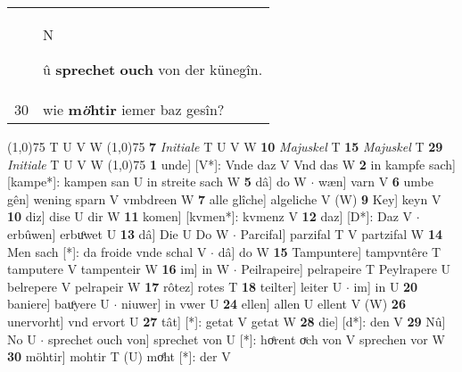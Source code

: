 \documentclass[8pt,a4paper,notitlepage]{article}
\begin{document}
\begin{table}[ht]
\begin{minipage}[t]{0.5\linewidth}
\begin{tabular}{rl}
 & \begin{large}N\end{large}û \textbf{sprechet} \textbf{ouch} von der künegîn.\\ 
30 & wie \textbf{m\textit{ö}htir} iemer baz gesîn?\\ 
\end{tabular}
\scriptsize
\line(1,0){75} \newline
T U V W \newline
\line(1,0){75} \newline
\textbf{7} \textit{Initiale} T U V W  \textbf{10} \textit{Majuskel} T  \textbf{15} \textit{Majuskel} T  \textbf{29} \textit{Initiale} T U V W  \newline
\line(1,0){75} \newline
\textbf{1} unde] [V*]: Vnde daz V Vnd das W \textbf{2} in kampfe sach] [kampe*]: kampen san U in streite sach W \textbf{5} dâ] do W  $\cdot$ wæn] varn V \textbf{6} umbe gên] wening sparn V vmbdreen W \textbf{7} alle glîche] algeliche V (W) \textbf{9} Key] keyn V \textbf{10} diz] dise U dir W \textbf{11} komen] [kvmen*]: kvmenz V \textbf{12} daz] [D*]: Daz V  $\cdot$ erbûwen] erbuͦwet U \textbf{13} dâ] Die U Do W  $\cdot$ Parcifal] parzifal T V partzifal W \textbf{14} Men sach [*]: da froide vnde schal V  $\cdot$ dâ] do W \textbf{15} Tampuntere] tampvntêre T tamputere V tampenteir W \textbf{16} im] in W  $\cdot$ Peilrapeire] pelrapeire T Peylrapere U belrepere V pelrapeir W \textbf{17} rôtez] rotes T \textbf{18} teilter] leiter U  $\cdot$ im] in U \textbf{20} baniere] bauͦyere U  $\cdot$ niuwer] in vwer U \textbf{24} ellen] allen U ellent V (W) \textbf{26} unervorht] vnd ervort U \textbf{27} tât] [*]: getat V getat W \textbf{28} die] [d*]: den V \textbf{29} Nû] No U  $\cdot$ sprechet ouch von] sprechet von U [*]: hoͤrent oͮch von V sprechen vor W \textbf{30} möhtir] mohtir T (U) moͤht [*]: der  V \newline
\end{minipage}
\end{table}
\end{document}
